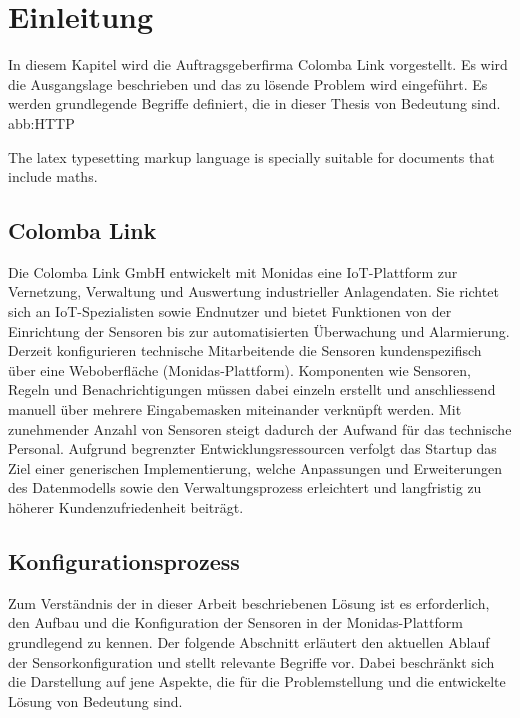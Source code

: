 \section{Einleitung}
In diesem Kapitel wird die Auftragsgeberfirma Colomba Link vorgestellt. Es wird die Ausgangslage beschrieben und das zu lösende Problem wird eingeführt. Es werden grundlegende Begriffe definiert, die in dieser Thesis von Bedeutung sind.
\gls{abb:HTTP}

The \Gls{latex} typesetting markup language is specially suitable 
for documents that include \gls{maths}. 

\clearpage

\printglossaries
\clearpage

\subsection{Colomba Link}

Die Colomba Link GmbH entwickelt mit Monidas eine IoT-Plattform zur Vernetzung, Verwaltung und Auswertung industrieller Anlagendaten. Sie richtet sich an IoT-Spezialisten sowie Endnutzer und bietet Funktionen von der Einrichtung der Sensoren bis zur automatisierten Überwachung und Alarmierung. Derzeit konfigurieren technische Mitarbeitende die Sensoren kundenspezifisch über eine Weboberfläche (Monidas-Plattform). Komponenten wie Sensoren, Regeln und Benachrichtigungen müssen dabei einzeln erstellt und anschliessend manuell über mehrere Eingabemasken miteinander verknüpft werden. Mit zunehmender Anzahl von Sensoren steigt dadurch der Aufwand für das technische Personal. Aufgrund begrenzter Entwicklungsressourcen verfolgt das Startup das Ziel einer generischen Implementierung, welche Anpassungen und Erweiterungen des Datenmodells sowie den Verwaltungsprozess erleichtert und langfristig zu höherer Kundenzufriedenheit beiträgt. 

\subsection{Konfigurationsprozess}
\label{kap:konf}

Zum Verständnis der in dieser Arbeit beschriebenen Lösung ist es erforderlich, den Aufbau und die Konfiguration der Sensoren in der Monidas-Plattform grundlegend zu kennen. Der folgende Abschnitt erläutert den aktuellen Ablauf der Sensorkonfiguration und stellt relevante Begriffe vor. Dabei beschränkt sich die Darstellung auf jene Aspekte, die für die Problemstellung und die entwickelte Lösung von Bedeutung sind.

